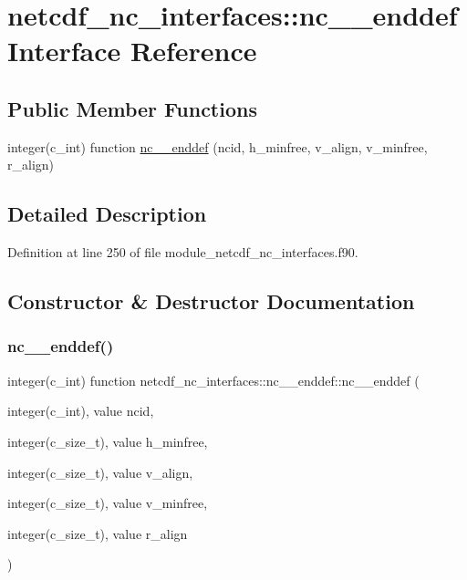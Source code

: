 \hypertarget{interfacenetcdf__nc__interfaces_1_1nc____enddef}{}\section{netcdf\+\_\+nc\+\_\+interfaces\+:\+:nc\+\_\+\+\_\+enddef Interface Reference}
\label{interfacenetcdf__nc__interfaces_1_1nc____enddef}
\subsection*{Public Member Functions}
\begin{DoxyCompactItemize}
\item 
integer(c\+\_\+int) function \hyperlink{interfacenetcdf__nc__interfaces_1_1nc____enddef_af6318c0c09ff396922d6731e3ca5bd61}{nc\+\_\+\+\_\+enddef} (ncid, h\+\_\+minfree, v\+\_\+align, v\+\_\+minfree, r\+\_\+align)
\end{DoxyCompactItemize}


\subsection{Detailed Description}


Definition at line 250 of file module\+\_\+netcdf\+\_\+nc\+\_\+interfaces.\+f90.



\subsection{Constructor \& Destructor Documentation}
\mbox{\label{interfacenetcdf__nc__interfaces_1_1nc____enddef_af6318c0c09ff396922d6731e3ca5bd61}} 
\subsubsection{\texorpdfstring{nc\+\_\+\+\_\+enddef()}{nc\_\_enddef()}}
{\footnotesize\ttfamily integer(c\+\_\+int) function netcdf\+\_\+nc\+\_\+interfaces\+::nc\+\_\+\+\_\+enddef\+::nc\+\_\+\+\_\+enddef (\begin{DoxyParamCaption}\item[{integer(c\+\_\+int), value}]{ncid,  }\item[{integer(c\+\_\+size\+\_\+t), value}]{h\+\_\+minfree,  }\item[{integer(c\+\_\+size\+\_\+t), value}]{v\+\_\+align,  }\item[{integer(c\+\_\+size\+\_\+t), value}]{v\+\_\+minfree,  }\item[{integer(c\+\_\+size\+\_\+t), value}]{r\+\_\+align }\end{DoxyParamCaption})}



